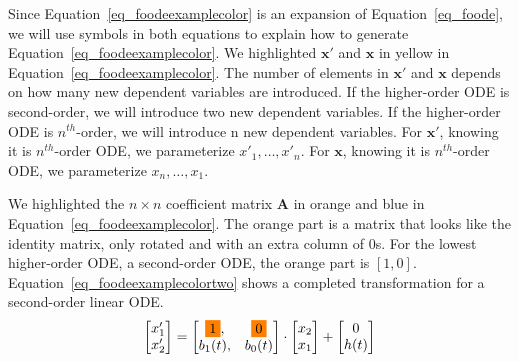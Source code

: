 Since Equation~\ref{eq_foodeexamplecolor} is an expansion of Equation~\ref{eq_foode}, we will use symbols in both equations to explain how to generate Equation~\ref{eq_foodeexamplecolor}. We highlighted $\boldsymbol{x'}$ and $\boldsymbol{x}$ in yellow in Equation~\ref{eq_foodeexamplecolor}. The number of elements in $\boldsymbol{x'}$ and $\boldsymbol{x}$ depends on how many new dependent variables are introduced. If the higher-order ODE is second-order, we will introduce two new dependent variables. If the higher-order ODE is $n^{th}$-order, we will introduce n new dependent variables. For $\boldsymbol{x'}$, knowing it is $n^{th}$-order ODE, we parameterize $x'_{1}, \dots, x'_{n}$. For $\boldsymbol{x}$, knowing it is $n^{th}$-order ODE, we parameterize $x_{n}, \dots, x_{1}$.

We highlighted the $n \times n$ coefficient matrix $\boldsymbol{A}$ in orange and blue in Equation~\ref{eq_foodeexamplecolor}. The orange part is a matrix that looks like the identity matrix, only rotated and with an extra column of 0s. For the lowest higher-order ODE, a second-order ODE, the orange part is $[1, 0]$. Equation~\ref{eq_foodeexamplecolortwo} shows a completed transformation for a second-order linear ODE.
\begin{equation} \label{eq_foodeexamplecolortwo}
	\begin{bmatrix}
		{x_{1}'} \\
    {x_{2}'} 
	\end{bmatrix}
    = 
  \begin{bmatrix}
		\highlight{orange}{1}, & \highlight{orange}{0} \\
    {b_{1}(t)}, & {b_{0}(t)}
	\end{bmatrix}
    \cdot
  \begin{bmatrix}
		{x_{2}} \\
    {x_{1}} 
	\end{bmatrix}
    + 
  \begin{bmatrix}
    {0} \\
    {h(t)}
	\end{bmatrix}
\end{equation}


